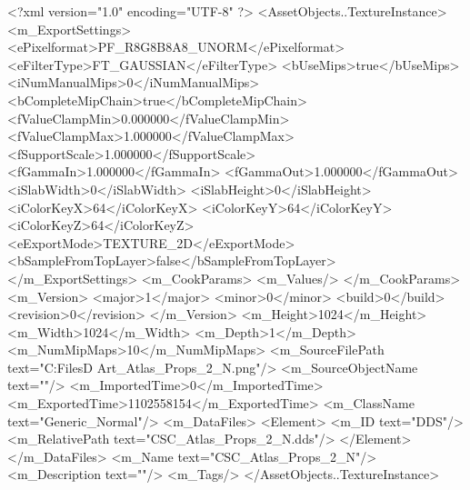 <?xml version="1.0" encoding="UTF-8" ?>
<AssetObjects..TextureInstance>
	<m_ExportSettings>
		<ePixelformat>PF_R8G8B8A8_UNORM</ePixelformat>
		<eFilterType>FT_GAUSSIAN</eFilterType>
		<bUseMips>true</bUseMips>
		<iNumManualMips>0</iNumManualMips>
		<bCompleteMipChain>true</bCompleteMipChain>
		<fValueClampMin>0.000000</fValueClampMin>
		<fValueClampMax>1.000000</fValueClampMax>
		<fSupportScale>1.000000</fSupportScale>
		<fGammaIn>1.000000</fGammaIn>
		<fGammaOut>1.000000</fGammaOut>
		<iSlabWidth>0</iSlabWidth>
		<iSlabHeight>0</iSlabHeight>
		<iColorKeyX>64</iColorKeyX>
		<iColorKeyY>64</iColorKeyY>
		<iColorKeyZ>64</iColorKeyZ>
		<eExportMode>TEXTURE_2D</eExportMode>
		<bSampleFromTopLayer>false</bSampleFromTopLayer>
	</m_ExportSettings>
	<m_CookParams>
		<m_Values/>
	</m_CookParams>
	<m_Version>
		<major>1</major>
		<minor>0</minor>
		<build>0</build>
		<revision>0</revision>
	</m_Version>
	<m_Height>1024</m_Height>
	<m_Width>1024</m_Width>
	<m_Depth>1</m_Depth>
	<m_NumMipMaps>10</m_NumMipMaps>
	<m_SourceFilePath text="C:\Users\Shadow\Desktop\Working Files\3D Art\Textures\CSC_Atlas_Props_2_N.png"/>
	<m_SourceObjectName text=""/>
	<m_ImportedTime>0</m_ImportedTime>
	<m_ExportedTime>1102558154</m_ExportedTime>
	<m_ClassName text="Generic_Normal"/>
	<m_DataFiles>
		<Element>
			<m_ID text="DDS"/>
			<m_RelativePath text="CSC_Atlas_Props_2_N.dds"/>
		</Element>
	</m_DataFiles>
	<m_Name text="CSC_Atlas_Props_2_N"/>
	<m_Description text=""/>
	<m_Tags/>
</AssetObjects..TextureInstance>

